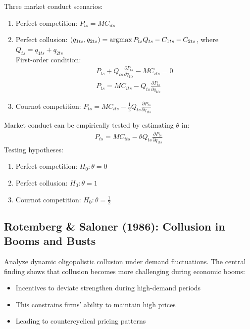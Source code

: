 \documentclass[11pt]{elegantbook_2}
\newcommand{\argmax}{\operatornamewithlimits{argmax}}
\begin{document}
Three market conduct scenarios:
\begin{enumerate}
    \item Perfect competition: $P_{ts}=MC_{its}$
    \item Perfect collusion: $(q_{1ts},q_{2ts})=\argmax P_{ts}Q_{ts}-C_{1ts}-C_{2ts}$, where $Q_{ts}=q_{1ts}+q_{2ts}$\\
    First-order condition:
    \begin{equation}
        \begin{aligned}
            P_{ts}+Q_{ts}\frac{\partial P_{ts}}{\partial q_{1ts}}-MC_{its}=0\\
            P_{ts}=MC_{its}-Q_{ts}\frac{\partial P_{ts}}{\partial q_{1ts}}
        \end{aligned}
        \nonumber
    \end{equation}
    \item Cournot competition: $P_{ts}=MC_{its}-\frac{1}{2}Q_{ts}\frac{\partial P_{ts}}{\partial q_{1ts}}$
\end{enumerate}

Market conduct can be empirically tested by estimating $\theta$ in:
\begin{equation}
    \begin{aligned}
        P_{ts}=MC_{its}-\theta Q_{ts}\frac{\partial P_{ts}}{\partial q_{1ts}}
    \end{aligned}
    \nonumber
\end{equation}
Testing hypotheses:
\begin{enumerate}
    \item Perfect competition: $H_0: \theta=0$
    \item Perfect collusion: $H_0: \theta=1$
    \item Cournot competition: $H_0: \theta=\frac{1}{2}$
\end{enumerate}


\subsection{Rotemberg \& Saloner (1986): Collusion in Booms and Busts}

Analyze dynamic oligopolistic collusion under demand fluctuations. The central finding shows that collusion becomes more challenging during economic booms:
\begin{itemize}
    \item Incentives to deviate strengthen during high-demand periods
    \item This constrains firms' ability to maintain high prices
    \item Leading to countercyclical pricing patterns
\end{itemize}
\end{document}
